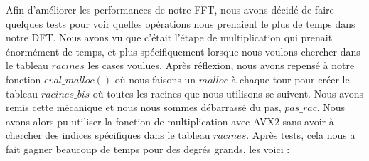 \documentclass[12pt, a4paper]{article}
\begin{document}
Afin d'améliorer les performances de notre FFT, nous avons décidé de faire quelques tests pour voir quelles opérations nous prenaient le plus de temps dans notre DFT. Nous avons vu que c'était l'étape de multiplication qui prenait énormément de temps, et plus spécifiquement lorsque nous voulons chercher dans le tableau $racines$ les cases voulues. Après réflexion, nous avons repensé à notre fonction $eval\_malloc()$ où nous faisons un $malloc$ à chaque tour pour créer le tableau $racines\_bis$ où toutes les racines que nous utilisons se suivent. Nous avons remis cette mécanique et nous nous sommes débarrassé du pas, $pas\_rac$. Nous avons alors pu utiliser la fonction de multiplication avec AVX2 sans avoir à chercher des indices spécifiques dans le tableau $racines$. 
\newpage
Après tests, cela nous a fait gagner beaucoup de temps pour des degrés grands, les voici : 
\end{document}
